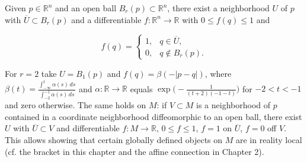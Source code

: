 \begin{remark}
  \label{rem:dc-ch0-5-7}
  Given $p\in\mathbb{R}^n$ and an open ball $B_r(p)\subset\mathbb{R}^n$, there exist
  a neighborhood $U$ of $p$ with $\overline U\subset B_r(p)$ and a differentiable
  $f:\mathbb{R}^n\to\mathbb{R}$ with $0\le f(q)\le1$ and
  
  $$
  f(q)=\begin{cases}1,&q\in\overline U,\\ 0,&q\notin B_r(p).\end{cases}
  $$
  
  For $r=2$ take $U=B_1(p)$ and $f(q)=\beta(-|p-q|)$, where
  $\beta(t)=\frac{\int_{-\infty}^t\alpha(s)\,ds}{\int_{-2}^{-1}\alpha(s)\,ds}$ and
  $\alpha:\mathbb{R}\to\mathbb{R}$ equals $\exp\big(-\frac{1}{(t+2)(-1-t)}\big)$ for
  $-2<t<-1$ and zero otherwise. The same holds on $M$: if $V\subset M$ is a
  neighborhood of $p$ contained in a coordinate neighborhood diffeomorphic to an
  open ball, there exist $U$ with $\overline U\subset V$ and differentiable
  $f:M\to\mathbb{R}$, $0\le f\le1$, $f=1$ on $\overline U$, $f=0$ off $V$. This
  allows showing that certain globally defined objects on $M$ are in reality local
  (cf. the bracket in this chapter and the affine connection in Chapter 2).
\end{remark}
